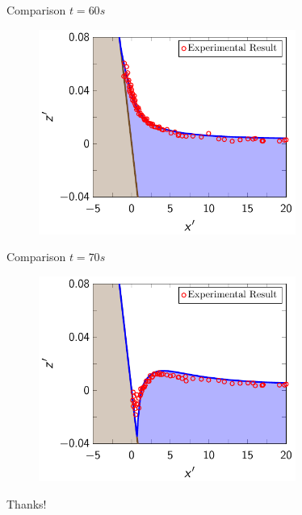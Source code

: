 \documentclass[pdf]{beamer}
\begin{document}
\begin{frame}{Comparison $t=60s$}
	\begin{figure}
		\includegraphics[width=0.75\textwidth]{./Pics/Synolakis/t=60s.pdf}
	\end{figure}
\end{frame}

\begin{frame}{Comparison $t=70s$}
	\begin{figure}
		\includegraphics[width=0.75\textwidth]{./Pics/Synolakis/t=70s.pdf}
	\end{figure}
\end{frame}

\begin{frame}{}
	\centering \Huge Thanks!
\end{frame}
\end{document}
